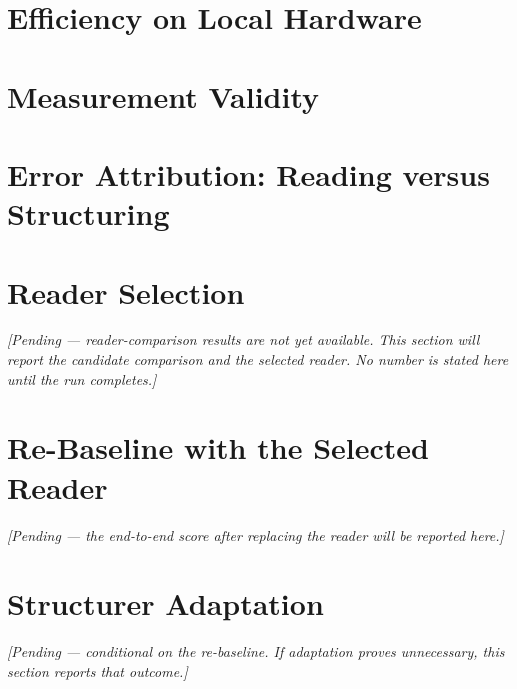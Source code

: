\section{Efficiency on Local Hardware}
\label{sec:res-efficiency}

\section{Measurement Validity}
\label{sec:res-measurement}

\section{Error Attribution: Reading versus Structuring}
\label{sec:res-attribution}

\section{Reader Selection}
\label{sec:res-reader-selection}
\noindent\textit{[Pending --- reader-comparison results are not yet available.
This section will report the candidate comparison and the selected reader. No
number is stated here until the run completes.]}

\section{Re-Baseline with the Selected Reader}
\label{sec:res-rebaseline}
\noindent\textit{[Pending --- the end-to-end score after replacing the reader will
be reported here.]}

\section{Structurer Adaptation}
\label{sec:res-finetune}
\noindent\textit{[Pending --- conditional on the re-baseline. If adaptation proves
unnecessary, this section reports that outcome.]}
